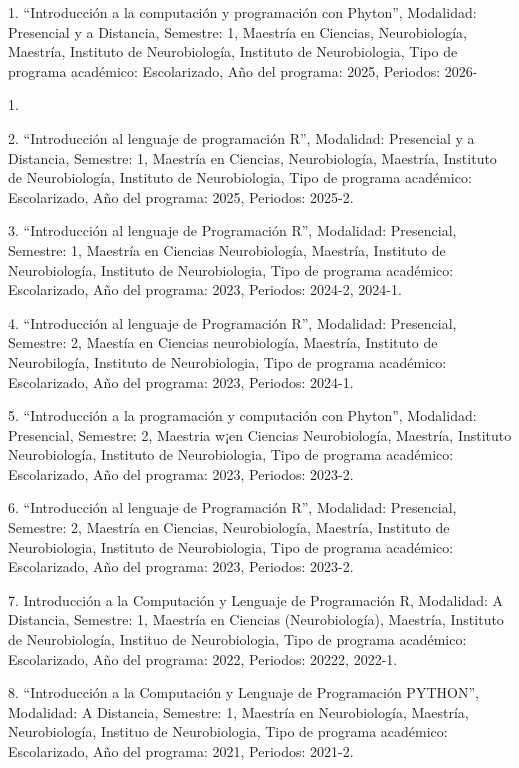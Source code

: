 1. “Introducción a la computación y programación con Phyton”, Modalidad: Presencial y a Distancia, 
Semestre: 1, Maestría en Ciencias, Neurobiología, Maestría, Instituto de Neurobiología, Instituto de 
Neurobiologia, Tipo de programa académico: Escolarizado, Año del programa: 2025, Periodos: 2026-

1.

2. “Introducción al lenguaje de programación R”, Modalidad: Presencial y a Distancia, Semestre: 1, 
Maestría en Ciencias, Neurobiología, Maestría, Instituto de Neurobiología, Instituto de 
Neurobiologia, Tipo de programa académico: Escolarizado, Año del programa: 2025, Periodos: 2025-2.

3. “Introducción al lenguaje de Programación R”, Modalidad: Presencial, Semestre: 1, Maestría en 
Ciencias Neurobiología, Maestría, Instituto de Neurobiología, Instituto de Neurobiologia, Tipo de 
programa académico: Escolarizado, Año del programa: 2023, Periodos: 2024-2, 2024-1.

4. “Introducción al lenguaje de Programación R”, Modalidad: Presencial, Semestre: 2, Maestía en 
Ciencias neurobiología, Maestría, Instituto de Neurobilogía, Instituto de Neurobiologia, Tipo de 
programa académico: Escolarizado, Año del programa: 2023, Periodos: 2024-1.

5. “Introducción a la programación y computación con Phyton”, Modalidad: Presencial, Semestre: 2, 
Maestria w¡en Ciencias Neurobiología, Maestría, Instituto Neurobiología, Instituto de Neurobiologia, 
Tipo de programa académico: Escolarizado, Año del programa: 2023, Periodos: 2023-2.

6. “Introducción al lenguaje de Programación R”, Modalidad: Presencial, Semestre: 2, Maestría en 
Ciencias, Neurobiología, Maestría, Instituto de Neurobiologia, Instituto de Neurobiologia, Tipo de 
programa académico: Escolarizado, Año del programa: 2023, Periodos: 2023-2.

7. Introducción a la Computación y Lenguaje de Programación R, Modalidad: A Distancia, Semestre: 1, 
Maestría en Ciencias (Neurobiología), Maestría, Instituto de Neurobiología, Instituo de 
Neurobiologia, Tipo de programa académico: Escolarizado, Año del programa: 2022, Periodos: 20222, 
2022-1.

8. “Introducción a la Computación y Lenguaje de Programación PYTHON”, Modalidad: A Distancia, 
Semestre: 1, Maestría en Neurobiología, Maestría, Neurobiología, Instituo de Neurobiologia, Tipo de 
programa académico: Escolarizado, Año del programa: 2021, Periodos: 2021-2.

